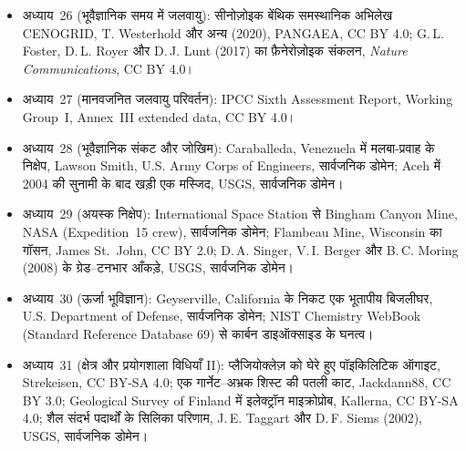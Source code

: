 \begin{itemize}
  \item अध्याय~26 (भूवैज्ञानिक समय में जलवायु): सीनोज़ोइक बेंथिक समस्थानिक अभिलेख CENOGRID, T. Westerhold और अन्य (2020), PANGAEA, CC BY 4.0; G.\,L. Foster, D.\,L. Royer और D.\,J. Lunt (2017) का फ़ैनेरोज़ोइक  संकलन, \emph{Nature Communications}, CC BY 4.0।
  \item अध्याय~27 (मानवजनित जलवायु परिवर्तन): IPCC Sixth Assessment Report, Working Group~I, Annex~III extended data, CC BY 4.0।
  \item अध्याय~28 (भूवैज्ञानिक संकट और जोखिम): Caraballeda, Venezuela में मलबा-प्रवाह के निक्षेप, Lawson Smith, U.S. Army Corps of Engineers, सार्वजनिक डोमेन; Aceh में 2004 की सुनामी के बाद खड़ी एक मस्जिद, USGS, सार्वजनिक डोमेन।
  \item अध्याय~29 (अयस्क निक्षेप): International Space Station से Bingham Canyon Mine, NASA (Expedition~15 crew), सार्वजनिक डोमेन; Flambeau Mine, Wisconsin का गॉसन, James St.~John, CC BY 2.0; D.\,A. Singer, V.\,I. Berger और B.\,C. Moring (2008) के ग्रेड--टनभार आँकड़े, USGS, सार्वजनिक डोमेन।
  \item अध्याय~30 (ऊर्जा भूविज्ञान): Geyserville, California के निकट एक भूतापीय बिजलीघर, U.S. Department of Defense, सार्वजनिक डोमेन; NIST Chemistry WebBook (Standard Reference Database 69) से कार्बन डाइऑक्साइड के घनत्व।
  \item अध्याय~31 (क्षेत्र और प्रयोगशाला विधियाँ II): प्लैजियोक्लेज़ को घेरे हुए पॉइकिलिटिक ऑगाइट, Strekeisen, CC BY-SA 4.0; एक गार्नेट--अभ्रक शिस्ट की पतली काट, Jackdann88, CC BY 3.0; Geological Survey of Finland में इलेक्ट्रॉन माइक्रोप्रोब, Kallerna, CC BY-SA 4.0; शैल संदर्भ पदार्थों के सिलिका परिणाम, J.\,E. Taggart और D.\,F. Siems (2002), USGS, सार्वजनिक डोमेन।
\end{itemize}
